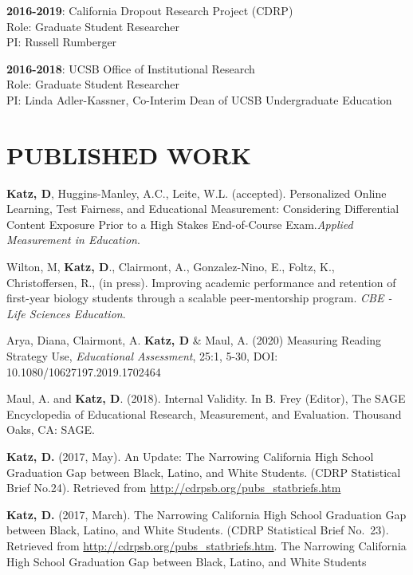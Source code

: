 \documentclass[12pt, oneside,]{memoir}
\begin{document}
\begin{hangparas}{.25in}{1}
\noindent \textbf{2016-2019}: California Dropout Research Project (CDRP)\\
\hspace*{0.333em}\hspace*{0.333em}Role: Graduate Student Researcher\\
\hspace*{0.333em}\hspace*{0.333em}PI: Russell Rumberger

\noindent \textbf{2016-2018}: UCSB Office of Institutional Research\\
\hspace*{0.333em}\hspace*{0.333em}Role: Graduate Student Researcher\\
\hspace*{0.333em}\hspace*{0.333em}PI: Linda Adler-Kassner, Co-Interim
Dean of UCSB Undergraduate Education
\vspace{4mm}
\end{hangparas}

\hypertarget{published-work}{%
\section{PUBLISHED WORK}\label{published-work}}
\begin{hangparas}{.25in}{1}

\textbf{Katz, D}, Huggins-Manley, A.C., Leite, W.L. (accepted). Personalized Online Learning, Test Fairness, and Educational Measurement: Considering Differential Content Exposure Prior to a High Stakes End-of-Course Exam.\emph{Applied Measurement in Education}.

Wilton, M, \textbf{Katz, D}., Clairmont, A., Gonzalez-Nino, E., Foltz, K., Christoffersen, R., (in press). Improving academic performance and retention of first-year biology students through a scalable peer-mentorship program. \emph{CBE - Life Sciences Education}.

Arya, Diana, Clairmont, A. \textbf{Katz, D} \& Maul, A. (2020) Measuring
Reading Strategy Use, \emph{Educational  Assessment}, 25:1, 5-30, DOI:
10.1080/10627197.2019.1702464

\noindent Maul, A. and \textbf{Katz, D}. (2018). Internal Validity. In B. Frey
(Editor), The SAGE Encyclopedia of Educational Research, Measurement,
and Evaluation. Thousand Oaks, CA: SAGE.

\noindent \textbf{Katz, D.} (2017, May). An Update: The Narrowing California High
School Graduation Gap between Black, Latino, and White Students. (CDRP
Statistical Brief No.24). Retrieved from
\url{http://cdrpsb.org/pubs_statbriefs.htm}

\noindent \textbf{Katz, D.} (2017, March). The Narrowing California High School
Graduation Gap between Black, Latino, and White Students. (CDRP
Statistical Brief No.~23). Retrieved from
\url{http://cdrpsb.org/pubs_statbriefs.htm}. The Narrowing California
High School Graduation Gap between Black, Latino, and White Students
\end{hangparas}
\vspace{4mm}
\end{document}

